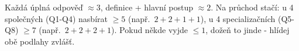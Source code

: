 \begin{infobox}[title={Bodování (orientačně)}]
\footnotesize Každá úplná odpověď $\approx3$, definice + hlavní postup $\approx2$. Na průchod stačí: u 4 společných (Q1-Q4) nasbírat $\ge5$ (např.\ $2{+}2{+}1{+}1$), u 4 specializačních (Q5-Q8) $\ge7$ (např.\ $2{+}2{+}2{+}1$). Pokud někde vyjde $\le1$, dožeň to jinde - hlídej obě podlahy zvlášť.
\end{infobox}
